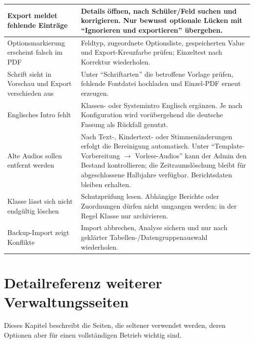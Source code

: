 \documentclass[12pt,a4paper]{article}
\begin{document}
\begin{longtable}{|p{}|p{}|}
\hline
Export meldet fehlende Einträge & Details öffnen, nach Schüler/Feld suchen und korrigieren. Nur bewusst optionale Lücken mit \enquote{Ignorieren und exportieren} übergehen.\\
\hline
Optionsmarkierung erscheint falsch im PDF & Feldtyp, zugeordnete Optionsliste, gespeicherten Value und Export-Kreuzfarbe prüfen; Einzeltest nach Korrektur wiederholen.\\
\hline
Schrift sieht in Vorschau und Export verschieden aus & Unter \enquote{Schriftarten} die betroffene Vorlage prüfen, fehlende Fontdatei hochladen und Einzel-PDF erneut erzeugen.\\
\hline
Englisches Intro fehlt & Klassen- oder Systemintro Englisch ergänzen. Je nach Konfiguration wird vorübergehend die deutsche Fassung als Rückfall genutzt.\\
\hline
Alte Audios sollen entfernt werden & Nach Text-, Kindertext- oder Stimmenänderungen erfolgt die Bereinigung automatisch. Unter \enquote{Template-Vorbereitung \(\rightarrow\) Vorlese-Audios} kann der Admin den Bestand kontrollieren; die Zeitraumslöschung bleibt für abgeschlossene Halbjahre verfügbar. Berichtsdaten bleiben erhalten.\\
\hline
Klasse lässt sich nicht endgültig löschen & Schutzprüfung lesen. Abhängige Berichte oder Zuordnungen dürfen nicht umgangen werden; in der Regel Klasse nur archivieren.\\
\hline
Backup-Import zeigt Konflikte & Import abbrechen, Analyse sichern und nur nach geklärter Tabellen-/Datengruppenauswahl wiederholen.\\
\hline
\end{longtable}

\section{Detailreferenz weiterer Verwaltungsseiten}
\label{sec:detailreferenz}
Dieses Kapitel beschreibt die Seiten, die seltener verwendet werden, deren Optionen aber für einen vollständigen Betrieb wichtig sind.
\end{document}
